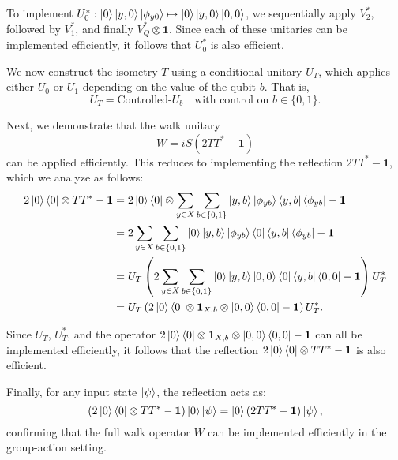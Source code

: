 \documentclass[12pt]{report}
\begin{document}
To implement \( U_0^* : \ket{0} \ket{y, 0} \ket{\phi_{y0}} \mapsto \ket{0} \ket{y, 0} \ket{0, 0} \), we sequentially apply \( V_2^* \), followed by \( V_1^* \), and finally \( V_Q^* \otimes \mathbf{1} \). Since each of these unitaries can be implemented efficiently, it follows that \( U_0^* \) is also efficient.

We now construct the isometry \( T \) using a conditional unitary \( U_T \), which applies either \( U_0 \) or \( U_1 \) depending on the value of the qubit \( b \). That is,
\[
U_T = \text{Controlled-}U_b \quad \text{with control on } b \in \{0,1\}.
\]

Next, we demonstrate that the walk unitary
\[
W = iS(2TT^* - \mathbf{1})
\]
can be applied efficiently. This reduces to implementing the reflection \( 2TT^* - \mathbf{1} \), which we analyze as follows:
\begin{align*}
2\ket{0}\bra{0} \otimes TT^* - \mathbf{1}
&= 2\ket{0}\bra{0} \otimes \sum_{y \in X} \sum_{b \in \{0,1\}} \ket{y,b} \ket{\phi_{yb}} \bra{y,b} \bra{\phi_{yb}} - \mathbf{1} \\
&= 2\sum_{y \in X} \sum_{b \in \{0,1\}} \ket{0} \ket{y,b} \ket{\phi_{yb}} \bra{0} \bra{y,b} \bra{\phi_{yb}} - \mathbf{1} \\
&= U_T \left( 2 \sum_{y \in X} \sum_{b \in \{0,1\}} \ket{0} \ket{y,b} \ket{0,0} \bra{0} \bra{y,b} \bra{0,0} - \mathbf{1} \right) U_T^* \\
&= U_T \left( 2\ket{0}\bra{0} \otimes \mathbf{1}_{X,b} \otimes \ket{0,0}\bra{0,0} - \mathbf{1} \right) U_T^*.
\end{align*}

Since \( U_T \), \( U_T^* \), and the operator \( 2\ket{0}\bra{0} \otimes \mathbf{1}_{X,b} \otimes \ket{0,0}\bra{0,0} - \mathbf{1} \) can all be implemented efficiently, it follows that the reflection \( 2\ket{0}\bra{0} \otimes TT^* - \mathbf{1} \) is also efficient.

Finally, for any input state \( \ket{\psi} \), the reflection acts as:
\[
\left(2\ket{0}\bra{0} \otimes TT^* - \mathbf{1} \right) \ket{0} \ket{\psi} = \ket{0} \left(2TT^* - \mathbf{1} \right) \ket{\psi},
\]
confirming that the full walk operator \( W \) can be implemented efficiently in the group-action setting.





\end{document}
